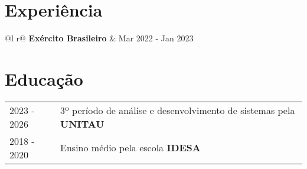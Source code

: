 \documentclass[a4paper,12pt]{article}
\begin{document}
\section{Experiência}
\begin{tabularx}{\linewidth}{ @{}l r@{} }
\textbf{Exército Brasileiro} & \hfill Mar 2022 - Jan 2023 \\[3.75pt]
\end{tabularx}

\section{Educação}
\begin{tabularx}{\linewidth}{@{}l X@{}}	
2023 - 2026 & 3º período de análise e desenvolvimento de sistemas pela \textbf{UNITAU} \\ 
2018 - 2020 & Ensino médio pela escola \textbf{IDESA} \\
\end{tabularx}

\end{document}
